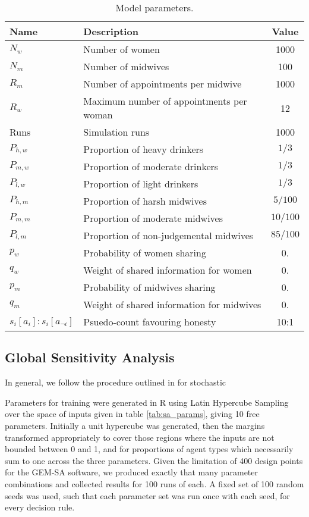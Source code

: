 \begin{table}
\center
\begin{tabular} {|l | l | c|}
\hline
Name & Description & Value \\ \hline
\(N_{w}\) & Number of women & 1000 \\ \hline
\(N_{m}\) & Number of midwives & 100 \\ \hline
\(R_{m}\) & Number of appointments per midwive & 1000 \\ \hline
\(R_{w}\) & Maximum number of appointments per woman & 12 \\ \hline
Runs & Simulation runs & 1000 \\ \hline
\(P_{h,w}\) & Proportion of heavy drinkers & \(1/3\) \\ \hline
\(P_{m,w}\) & Proportion of moderate drinkers & \(1/3\) \\ \hline
\(P_{l,w}\) & Proportion of light drinkers & \(1/3\) \\ \hline
\(P_{h,m}\) & Proportion of harsh midwives & \(5/100\) \\ \hline
\(P_{m,m}\) & Proportion of moderate midwives & \(10/100\) \\ \hline
\(P_{l,m}\) & Proportion of non-judgemental midwives & \(85/100\) \\ \hline
\(p_{w}\) & Probability of women sharing & 0. \\ \hline
\(q_{w}\) & Weight of shared information for women & 0. \\ \hline
\(p_{m}\) & Probability of midwives sharing & 0. \\ \hline
\(q_{m}\) & Weight of shared information for midwives & 0. \\ \hline
\(s_{i}[a_{i}]:s_{i}[a_{\neg i}]\) & Psuedo-count favouring honesty & 10:1 \\ \hline
\end{tabular}
\caption[Table caption text]{Model parameters. \label{tab:qt_params}}
\end{table}
\subsection{Global Sensitivity Analysis}
\label{sub:sensitivity}
In general, we follow the procedure outlined in \cite{Bijak2013b} for stochastic 

Parameters for training were generated in R \citep{RTeam2014} using Latin Hypercube Sampling \citep{Carnell2012} over the space of inputs given in table \ref{tab:sa_params}, giving 10 free parameters. Initially a unit hypercube was generated, then the margins transformed appropriately to cover those regions where the inputs are not bounded between 0 and 1, and for proportions of agent types which necessarily sum to one across the three parameters. Given the limitation of 400 design points for the \ac{GEM-SA} software, we produced exactly that many parameter combinations and collected results for 100 runs of each. A fixed set of 100 random seeds was used, such that each parameter set was run once with each seed, for every decision rule.


